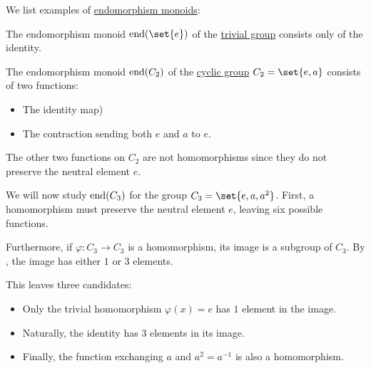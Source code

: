 \begin{example}\label{ex:def:endomorphism_monoid}
  We list examples of \hyperref[def:endomorphism_monoid]{endomorphism monoids}:
  \begin{thmenum}
     The endomorphism monoid \( \End(\set{ e }) \) of the \hyperref[def:group/trivial]{trivial group} consists only of the identity.

     The endomorphism monoid \( \operatorname{end}(C_2) \) of the \hyperref[def:cyclic_group]{cyclic group} \( C_2 = \set{ e, a } \) consists of two functions:
    \begin{itemize}
      \item The identity map)
      \item The contraction sending both \( e \) and \( a \) to \( e \).
    \end{itemize}

    The other two functions on \( C_2 \) are not homomorphisms since they do not preserve the neutral element \( e \).

     We will now study \( \operatorname{end}(C_3) \) for the group \( C_3 = \set{ e, a, a^2 } \). First, a homomorphism must preserve the neutral element \( e \), leaving six possible functions.

    Furthermore, if \( \varphi: C_3 \to C_3 \) is a homomorphism, its image is a subgroup of \( C_3 \). By , the image has either \( 1 \) or \( 3 \) elements.

    This leaves three candidates:
    \begin{itemize}
      \item Only the trivial homomorphism \( \varphi(x) = e \) has \( 1 \) element in the image.
      \item Naturally, the identity has \( 3 \) elements in its image.
      \item Finally, the function exchanging \( a \) and \( a^2 = a^{-1} \) is also a homomorphism.
    \end{itemize}
  \end{thmenum}
\end{example}

